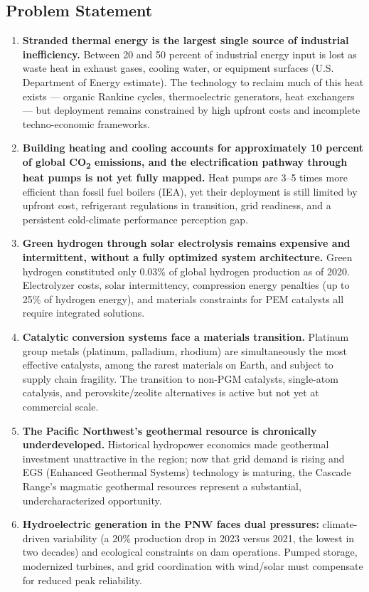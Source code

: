 \documentclass[11pt,letterpaper]{article}
\begin{document}
\subsection{Problem Statement}

\begin{enumerate}
  \item \textbf{Stranded thermal energy is the largest single source of industrial inefficiency.} Between 20 and 50 percent of industrial energy input is lost as waste heat in exhaust gases, cooling water, or equipment surfaces (U.S. Department of Energy estimate). The technology to reclaim much of this heat exists — organic Rankine cycles, thermoelectric generators, heat exchangers — but deployment remains constrained by high upfront costs and incomplete techno-economic frameworks.

  \item \textbf{Building heating and cooling accounts for approximately 10 percent of global CO\textsubscript{2} emissions, and the electrification pathway through heat pumps is not yet fully mapped.} Heat pumps are 3--5 times more efficient than fossil fuel boilers (IEA), yet their deployment is still limited by upfront cost, refrigerant regulations in transition, grid readiness, and a persistent cold-climate performance perception gap.

  \item \textbf{Green hydrogen through solar electrolysis remains expensive and intermittent, without a fully optimized system architecture.} Green hydrogen constituted only 0.03\% of global hydrogen production as of 2020. Electrolyzer costs, solar intermittency, compression energy penalties (up to 25\% of hydrogen energy), and materials constraints for PEM catalysts all require integrated solutions.

  \item \textbf{Catalytic conversion systems face a materials transition.} Platinum group metals (platinum, palladium, rhodium) are simultaneously the most effective catalysts, among the rarest materials on Earth, and subject to supply chain fragility. The transition to non-PGM catalysts, single-atom catalysis, and perovskite/zeolite alternatives is active but not yet at commercial scale.

  \item \textbf{The Pacific Northwest's geothermal resource is chronically underdeveloped.} Historical hydropower economics made geothermal investment unattractive in the region; now that grid demand is rising and EGS (Enhanced Geothermal Systems) technology is maturing, the Cascade Range's magmatic geothermal resources represent a substantial, undercharacterized opportunity.

  \item \textbf{Hydroelectric generation in the PNW faces dual pressures:} climate-driven variability (a 20\% production drop in 2023 versus 2021, the lowest in two decades) and ecological constraints on dam operations. Pumped storage, modernized turbines, and grid coordination with wind/solar must compensate for reduced peak reliability.
\end{enumerate}
\end{document}
